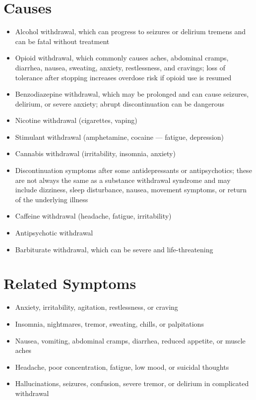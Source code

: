 \section*{Causes}
\begin{itemize}
 \item Alcohol withdrawal, which can progress to seizures or delirium tremens and can be fatal without treatment
 \item Opioid withdrawal, which commonly causes aches, abdominal cramps, diarrhea, nausea, sweating, anxiety, restlessness, and cravings; loss of tolerance after stopping increases overdose risk if opioid use is resumed
 \item Benzodiazepine withdrawal, which may be prolonged and can cause seizures, delirium, or severe anxiety; abrupt discontinuation can be dangerous
 \item Nicotine withdrawal (cigarettes, vaping)
 \item Stimulant withdrawal (amphetamine, cocaine — fatigue, depression)
 \item Cannabis withdrawal (irritability, insomnia, anxiety)
 \item Discontinuation symptoms after some antidepressants or antipsychotics; these are not always the same as a substance withdrawal syndrome and may include dizziness, sleep disturbance, nausea, movement symptoms, or return of the underlying illness
 \item Caffeine withdrawal (headache, fatigue, irritability)
 \item Antipsychotic withdrawal
 \item Barbiturate withdrawal, which can be severe and life-threatening
\end{itemize}

\section*{Related Symptoms}
\begin{itemize}
 \item Anxiety, irritability, agitation, restlessness, or craving
 \item Insomnia, nightmares, tremor, sweating, chills, or palpitations
 \item Nausea, vomiting, abdominal cramps, diarrhea, reduced appetite, or muscle aches
 \item Headache, poor concentration, fatigue, low mood, or suicidal thoughts
 \item Hallucinations, seizures, confusion, severe tremor, or delirium in complicated withdrawal
\end{itemize}

